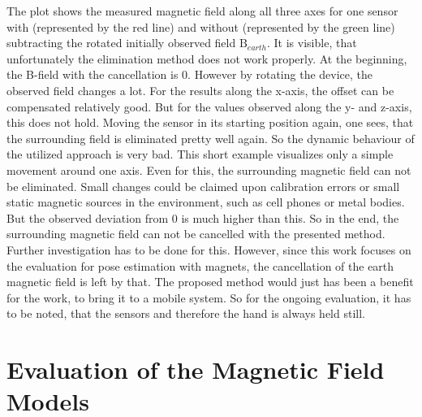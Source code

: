 The plot shows the measured magnetic field along all three axes for one sensor with (represented by the red line) and without (represented by the green line) subtracting the rotated initially observed field $ \mathrm{B}_{earth} $. It is visible, that unfortunately the elimination method does not work properly. At the beginning, the B-field with the cancellation is 0. However by rotating the device, the observed field changes a lot. For the results along the x-axis, the offset can be compensated relatively good. But for the values observed along the y- and z-axis, this does not hold. Moving the sensor in its starting position again, one sees, that the surrounding field is eliminated pretty well again. So the dynamic behaviour of the utilized approach is very bad. This short example visualizes only a simple movement around one axis. Even for this, the surrounding magnetic field can not be eliminated. Small changes could be claimed upon calibration errors or small static magnetic sources in the environment, such as cell phones or metal bodies. But the observed deviation from 0 is much higher than this. So in the end, the surrounding magnetic field can not be cancelled with the presented method. Further investigation has to be done for this. However, since this work focuses on the evaluation for pose estimation with magnets, the cancellation of the earth magnetic field is left by that. The proposed method would just has been a benefit for the work, to bring it to a mobile system. So for the ongoing evaluation, it has to be noted, that the sensors and therefore the hand is always held still. 


\section{Evaluation of the Magnetic Field Models} \label{sec:modelDif}

